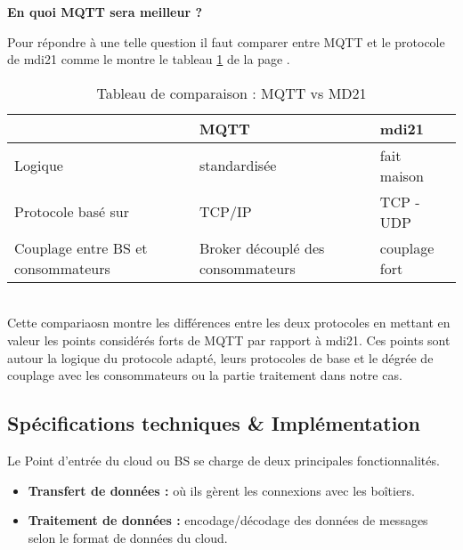     {
        \large 
        \centering
        \textbf{En quoi MQTT sera meilleur ?  } 
    
    }  
    Pour répondre à une telle question il faut comparer entre MQTT et le protocole de \gls{mdi21} comme le montre le tableau \ref{table:mqttvsmd21}
    de la page \pageref{table:mqttvsmd21}.
    \begin{table}[h!]
        \centering
        \begin{tabular}{|p{5cm}|p{5cm}|p{5cm}|}
            \hline
            \centering

               & MQTT & \gls{mdi21} \\
            \hline
            Logique & standardisée & fait maison  \\
            \hline
           Protocole basé sur & TCP/IP & TCP - UDP\\
            \hline 
            Couplage entre BS et consommateurs & Broker découplé des consommateurs & couplage fort \\
            \hline
        \end{tabular}   
        \caption{Tableau de comparaison : MQTT vs MD21}
        \label{table:mqttvsmd21}
    \end{table} \\
       

        Cette compariaosn montre les différences entre les deux protocoles en mettant en valeur les points considérés forts de MQTT par rapport
        à \gls{mdi21}. 
        Ces points sont autour la logique du protocole adapté, leurs protocoles de base et le dégrée de couplage avec les consommateurs 
        ou la partie traitement dans notre cas. \\
        
    \subsection{Spécifications techniques \& Implémentation}
       
        Le Point d’entrée du cloud ou BS se charge de deux principales fonctionnalités. 
        \begin{itemize}
            \renewcommand{\labelitemi}{$\bullet$}
            \item  \textbf{Transfert de données :} où ils gèrent les connexions avec les boîtiers.
            \item  \textbf{Traitement de données :} encodage/décodage des données de messages selon le format de données du cloud.
        \end{itemize}

